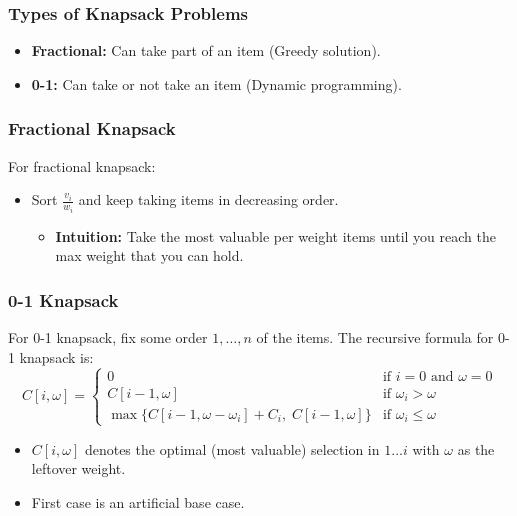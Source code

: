 \subsubsection{Types of Knapsack Problems}
\begin{definition}
    \begin{itemize}
        \item \textbf{Fractional:} Can take part of an item (Greedy solution).
        \item \textbf{0-1:} Can take or not take an item (Dynamic programming).
    \end{itemize}
\end{definition}

\subsubsection{Fractional Knapsack}
\begin{definition}
For fractional knapsack:
\begin{itemize}
    \item Sort $\frac{v_i}{w_i}$ and keep taking items in decreasing order.
    \begin{itemize}
        \item \textbf{Intuition:} Take the most valuable per weight items until you reach the max weight that you can hold.
    \end{itemize}
\end{itemize}
\end{definition}

\subsubsection{0-1 Knapsack}
\begin{definition}
    For 0-1 knapsack, fix some order $1, \dots, n$ of the items. The recursive formula for 0-1 knapsack is:
    \[
    C[i, \omega] = \begin{cases} 
        0 & \text{if } i = 0 \text{ and } \omega = 0 \\
        C[i-1, \omega] & \text{if } \omega_i > \omega \\
        \max \{C[i-1, \omega - \omega_i] +C_i, \; C[i-1, \omega]\} & \text{if } \omega_i \leq \omega
    \end{cases}
    \]
    \begin{itemize}
        \item $C[i, \omega]$ denotes the optimal (most valuable) selection in $1\ldots i$ with $\omega$ as the leftover weight.
        \item First case is an artificial base case.
    \end{itemize}
\end{definition}

